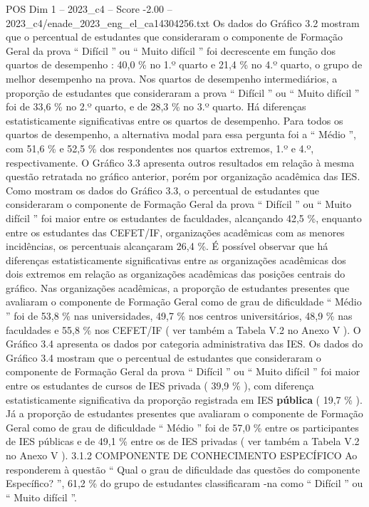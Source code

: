 \begin{textsample}{POS Dim 1 – 2023\_c4 – Score -2.00 – 2023\_c4/enade\_2023\_eng\_el\_ca14304256.txt}
Os dados do Gráfico 3.2 mostram que o percentual de estudantes que consideraram o componente de Formação Geral da prova “ Difícil ” ou “ Muito difícil ” foi decrescente em função dos quartos de desempenho : 40,0 \% no 1.º quarto e 21,4 \% no 4.º quarto, o grupo de melhor desempenho na prova.
Nos quartos de desempenho intermediários, a proporção de estudantes que consideraram a prova “ Difícil ” ou “ Muito difícil ” foi de 33,6 \% no 2.º quarto, e de 28,3 \% no 3.º quarto.
Há diferenças estatisticamente significativas entre os quartos de desempenho.
Para todos os quartos de desempenho, a alternativa modal para essa pergunta foi a “ Médio ”, com 51,6 \% e 52,5 \% dos respondentes nos quartos extremos, 1.º e 4.º, respectivamente.
O Gráfico 3.3 apresenta outros resultados em relação à mesma questão retratada no gráfico anterior, porém por organização acadêmica das IES.
Como mostram os dados do Gráfico 3.3, o percentual de estudantes que consideraram o componente de Formação Geral da prova “ Difícil ” ou “ Muito difícil ” foi maior entre os estudantes de faculdades, alcançando 42,5 \%, enquanto entre os estudantes das CEFET/IF, organizações acadêmicas com as menores incidências, os percentuais alcançaram 26,4 \%.
É possível observar que há diferenças estatisticamente significativas entre as organizações acadêmicas dos dois extremos em relação as organizações acadêmicas das posições centrais do gráfico.
Nas organizações acadêmicas, a proporção de estudantes presentes que avaliaram o componente de Formação Geral como de grau de dificuldade “ Médio ” foi de 53,8 \% nas universidades, 49,7 \% nos centros universitários, 48,9 \% nas faculdades e 55,8 \% nos CEFET/IF ( ver também a Tabela V.2 no Anexo V ).
O Gráfico 3.4 apresenta os dados por categoria administrativa das IES.
Os dados do Gráfico 3.4 mostram que o percentual de estudantes que consideraram o componente de Formação Geral da prova “ Difícil ” ou “ Muito difícil ” foi maior entre os estudantes de cursos de IES privada ( 39,9 \% ), com diferença estatisticamente significativa da proporção registrada em IES \textbf{pública} ( 19,7 \% ).
Já a proporção de estudantes presentes que avaliaram o componente de Formação Geral como de grau de dificuldade “ Médio ” foi de 57,0 \% entre os participantes de IES públicas e de 49,1 \% entre os de IES privadas ( ver também a Tabela V.2 no Anexo V ). 3.1.2 COMPONENTE DE CONHECIMENTO ESPECÍFICO Ao responderem à questão “ Qual o grau de dificuldade das questões do componente Específico? ”, 61,2 \% do grupo de estudantes classificaram -na como “ Difícil ” ou “ Muito difícil ”.

\end{textsample}
